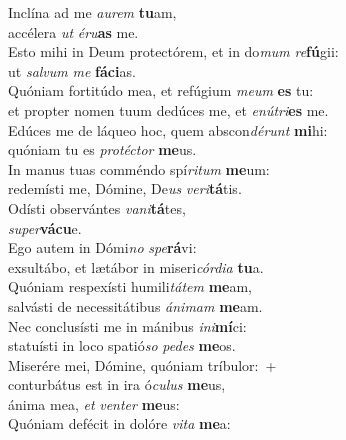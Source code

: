 \evenverse Inclína ad me \textit{au}\textit{rem} \textbf{tu}am,~\*\\
\evenverse accélera \textit{ut} \textit{é}\textit{ru}\textbf{as} me.\\
\oddverse Esto mihi in Deum protectórem, et in do\textit{mum} \textit{re}\textbf{fú}gii:~\*\\
\oddverse ut \textit{sal}\textit{vum} \textit{me} \textbf{fá}\textbf{ci}as.\\
\evenverse Quóniam fortitúdo mea, et refúgium \textit{me}\textit{um} \textbf{es} tu:~\*\\
\evenverse et propter nomen tuum dedúces me, et \textit{e}\textit{nú}\textit{tri}\textbf{es} me.\\
\oddverse Edúces me de láqueo hoc, quem abscon\textit{dé}\textit{runt} \textbf{mi}hi:~\*\\
\oddverse quóniam tu es \textit{pro}\textit{té}\textit{ctor} \textbf{me}us.\\
\evenverse In manus tuas comméndo spí\textit{ri}\textit{tum} \textbf{me}um:~\*\\
\evenverse redemísti me, Dómine, De\textit{us} \textit{ve}\textit{ri}\textbf{tá}tis.\\
\oddverse Odísti observántes \textit{va}\textit{ni}\textbf{tá}tes,~\*\\
\oddverse \textit{su}\textit{per}\textbf{vá}\textbf{cu}e.\\
\evenverse Ego autem in Dómi\textit{no} \textit{spe}\textbf{rá}vi:~\*\\
\evenverse exsultábo, et lætábor in miseri\textit{cór}\textit{di}\textit{a} \textbf{tu}a.\\
\oddverse Quóniam respexísti humili\textit{tá}\textit{tem} \textbf{me}am,~\*\\
\oddverse salvásti de necessitátibus \textit{á}\textit{ni}\textit{mam} \textbf{me}am.\\
\evenverse Nec conclusísti me in mánibus \textit{i}\textit{ni}\textbf{mí}ci:~\*\\
\evenverse statuísti in loco spatió\textit{so} \textit{pe}\textit{des} \textbf{me}os.\\
\oddverse Miserére mei, Dómine, quóniam tríbulor:~+\\
\oddverse  conturbátus est in ira ó\textit{cu}\textit{lus} \textbf{me}us,~\*\\
\oddverse ánima mea, \textit{et} \textit{ven}\textit{ter} \textbf{me}us:\\
\evenverse Quóniam defécit in dolóre \textit{vi}\textit{ta} \textbf{me}a:~\*\\
